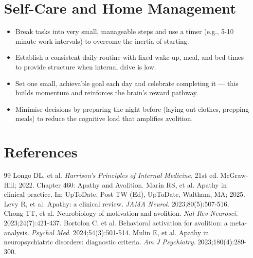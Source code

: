 \section*{Self-Care and Home Management}
\begin{itemize}
  \item Break tasks into very small, manageable steps and use a timer (e.g., 5-10 minute work intervals) to overcome the inertia of starting.
  \item Establish a consistent daily routine with fixed wake-up, meal, and bed times to provide structure when internal drive is low.
  \item Set one small, achievable goal each day and celebrate completing it — this builds momentum and reinforces the brain's reward pathway.
  \item Minimise decisions by preparing the night before (laying out clothes, prepping meals) to reduce the cognitive load that amplifies avolition.
\end{itemize}

\section*{References}

\begin{thebibliography}{99}
 Longo DL, et al. \emph{Harrison's Principles of Internal Medicine}. 21st ed. McGraw-Hill; 2022. Chapter 460: Apathy and Avolition.
 Marin RS, et al. Apathy in clinical practice. In: UpToDate, Post TW (Ed), UpToDate, Waltham, MA; 2025.
 Levy R, et al. Apathy: a clinical review. \emph{JAMA Neurol}. 2023;80(5):507-516.
 Chong TT, et al. Neurobiology of motivation and avolition. \emph{Nat Rev Neurosci}. 2023;24(7):421-437.
 Bortolon C, et al. Behavioral activation for avolition: a meta-analysis. \emph{Psychol Med}. 2024;54(3):501-514.
 Mulin E, et al. Apathy in neuropsychiatric disorders: diagnostic criteria. \emph{Am J Psychiatry}. 2023;180(4):289-300.
\end{thebibliography}
